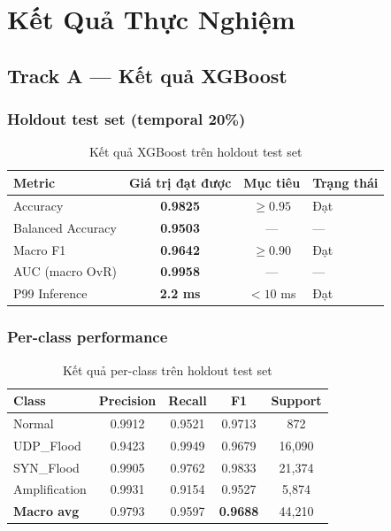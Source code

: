 \documentclass[12pt,a4paper]{article}
\begin{document}
\section{Kết Quả Thực Nghiệm}

\subsection{Track A --- Kết quả XGBoost}

\subsubsection{Holdout test set (temporal 20\%)}

\begin{table}[H]
\centering
\caption{Kết quả XGBoost trên holdout test set}
\label{tab:xgb_holdout}
\begin{tabular}{lccl}
\toprule
\textbf{Metric} & \textbf{Giá trị đạt được} & \textbf{Mục tiêu} & \textbf{Trạng thái} \\
\midrule
Accuracy           & \textbf{0.9825} & $\geq 0.95$  & Đạt \\
Balanced Accuracy  & \textbf{0.9503} & ---          & --- \\
Macro F1           & \textbf{0.9642} & $\geq 0.90$  & Đạt \\
AUC (macro OvR)    & \textbf{0.9958} & ---          & --- \\
P99 Inference      & \textbf{2.2 ms} & $< 10$ ms    & Đạt \\
\bottomrule
\end{tabular}
\end{table}

\subsubsection{Per-class performance}

\begin{table}[H]
\centering
\caption{Kết quả per-class trên holdout test set}
\label{tab:xgb_perclass}
\begin{tabular}{lcccc}
\toprule
\textbf{Class} & \textbf{Precision} & \textbf{Recall} & \textbf{F1} & \textbf{Support} \\
\midrule
Normal       & 0.9912 & 0.9521 & 0.9713 & 872 \\
UDP\_Flood   & 0.9423 & 0.9949 & 0.9679 & 16,090 \\
SYN\_Flood   & 0.9905 & 0.9762 & 0.9833 & 21,374 \\
Amplification & 0.9931 & 0.9154 & 0.9527 & 5,874 \\
\midrule
\textbf{Macro avg} & 0.9793 & 0.9597 & \textbf{0.9688} & 44,210 \\
\bottomrule
\end{tabular}
\end{table}
\end{document}
